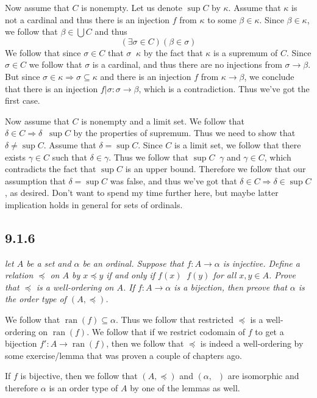 \documentclass[11pt,oneside,titlepage]{book}
\DeclareMathOperator \ra {\Rightarrow}
\DeclareMathOperator \ran {ran}
\DeclareMathOperator \ineq {\underline{\in}}
\begin{document}
Now assume that $C$ is nonempty. Let us denote $\sup C$ by $\kappa$. Assume that $\kappa$
is not a cardinal and thus there is an injection $f$ from $\kappa$ to some $\beta \in \kappa$.
Since $\beta \in \kappa$, we follow that $\beta \in \bigcup C$ and thus
$$(\exists \sigma  \in C)(\beta \in \sigma)$$
We follow that since $\sigma \in C$ that $\sigma \ineq \kappa$ by the fact that $\kappa$
is a supremum of $C$. Since $\sigma \in C$ we follow that $\sigma$ is a cardinal,
and thus there are no injections from $\sigma \to \beta$. But since $\sigma \in \kappa \ra
\sigma \subseteq \kappa$ and there is an injection $f$  from $\kappa \to \beta$, we conclude that
there is an injection $f|\sigma: \sigma \to \beta$, which is a contradiction. Thus we've got
the first case.

Now assume that $C$ is nonempty and a limit set. We follow that
$\delta \in C \ra \delta \ineq \sup{C}$ by the properties of supremum. Thus we need
to show that $\delta \neq \sup C$. Assume that $\delta = \sup C$. Since $C$ is a limit
set, we follow that there exists $\gamma \in C$ such that $\delta \in \gamma$.
Thus we follow that $\sup C \ineq \gamma$ and $\gamma \in C$, which contradicts the
fact that $\sup C$ is an upper bound. Therefore we follow that our assumption that
$\delta = \sup C$ was false, and thus we've got that $\delta \in C \ra \delta \in \sup{C}$,
as desired. Don't want to spend my time further here, but maybe latter implication holds in
general for sets of ordinals.

\subsection*{9.1.6}

\textit{let $A$ be a set and $\alpha$ be an ordinal. Suppose that $f: A \to \alpha$ is
  injective. Define a relation $\preceq$ on $A$ by $x \preceq y$ if and only if $f(x) \ineq f(y)$
  for all $x, y \in A$. Prove that $\preceq$ is a well-ordering on $A$. If $f: A \to \alpha$
  is a bijection, then preove that $\alpha$ is the order type of $(A, \preceq)$.}

We follow that $\ran(f) \subseteq \alpha$. Thus we follow that restricted $\preceq$ is a
well-ordering on $\ran(f)$. We follow that if we restrict codomain of $f$ to
get a bijection $f': A \to \ran(f)$, then we follow that $\preceq$ is
indeed a well-ordering by some exercise/lemma that was proven a couple of chapters ago.

If $f$ is bijective, then we follow that $(A, \preceq)$ and $(\alpha, \ineq)$ are isomorphic
and therefore $\alpha$ is an order type of $A$ by one of the lemmas as well.\
\end{document}
